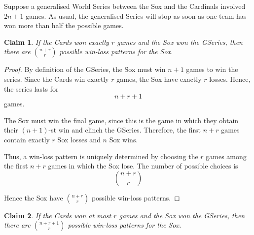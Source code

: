 \documentclass{article}
\newtheorem{claim}{Claim}
\begin{document}
Suppose a generalised World Series between the Sox and the Cardinals involved $2n + 1$ games. As 
usual, the generalised Series will stop as soon as one team has won more than half the possible 
games.

\begin{claim}
    If the Cards won exactly $r$ games and the Sox won the GSeries, then there are 
    $\binom{n + r}{r}$ possible win-loss patterns for the Sox.
\end{claim}

\begin{proof}
    By definition of the GSeries, the Sox must win $n + 1$ games to win the series. Since the Cards 
    win exactly $r$ games, the Sox have exactly $r$ losses. Hence, the series lasts for 
    \[
    n + r + 1
    \]
    games.
    
    \medskip
    
    The Sox must win the final game, since this is the game in which they obtain their $(n+1)$-st 
    win and clinch the GSeries. Therefore, the first $n + r$ games contain exactly $r$ Sox losses 
    and $n$ Sox wins.

    \medskip

    Thus, a win-loss pattern is uniquely determined by choosing the $r$ games among the first 
    $n + r$ games in which the Sox lose. The number of possible choices is
    \[
    \binom{n + r}{r}
    \]

    \medskip

    Hence the Sox have $\binom{n + r}{r}$ possible win-loss patterns.
\end{proof}

\begin{claim}
    If the Cards won at most $r$ games and the Sox won the GSeries, then there are 
    $\binom{n + r + 1}{r}$ possible win-loss patterns for the Sox.
\end{claim}
\end{document}
